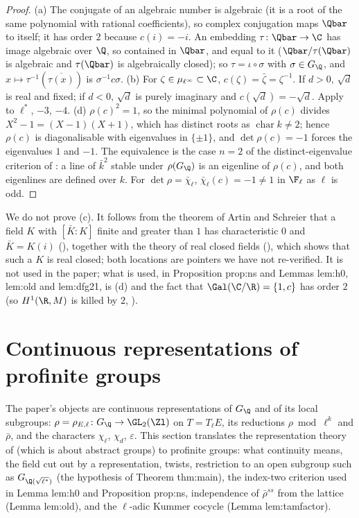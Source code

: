 \begin{proof}
(a) The conjugate of an algebraic number is algebraic (it is a root of the same polynomial with rational coefficients), so complex conjugation maps $\Qbar$ to
itself; it has order $2$ because $c(i)=-i$. An embedding $\tau\colon\Qbar\to\C$ has image algebraic over $\Q$, so contained in $\Qbar$, and equal to it
($\Qbar/\tau(\Qbar)$ is algebraic and $\tau(\Qbar)$ is algebraically closed); so $\tau=\iota\circ\sigma$ with $\sigma\in G_\Q$, and $x\mapsto\tau^{-1}(\overline{\tau(x)})$
is $\sigma^{-1}c\sigma$.
(b) For $\zeta\in\mu_{\ell^\infty}\subset\C$, $c(\zeta)=\bar\zeta=\zeta^{-1}$. If $d>0$, $\sqrt d$ is real and fixed; if $d<0$, $\sqrt d$ is purely imaginary and
$c(\sqrt d)=-\sqrt d$. Apply to $\ell^*$, $-3$, $-4$.
(d) $\rho(c)^2=1$, so the minimal polynomial of $\rho(c)$ divides $X^2-1=(X-1)(X+1)$, which has distinct roots as $\operatorname{char}k\ne2$; hence $\rho(c)$ is
diagonalisable with eigenvalues in $\{\pm1\}$, and $\det\rho(c)=-1$ forces the eigenvalues $1$ and $-1$. The equivalence is the case $n=2$ of the distinct-eigenvalue
criterion of : a line of $\bar k^2$ stable under $\rho(G_\Q)$ is an eigenline of $\rho(c)$, and both eigenlines are defined over $k$. For
$\det\rho=\bar\chi_\ell$, $\bar\chi_\ell(c)=-1\ne1$ in $\F_\ell$ as $\ell$ is odd.
\end{proof}

We do not prove (c). It follows from the theorem of Artin and Schreier that a field $K$ with $[\bar K:K]$ finite and greater than $1$ has characteristic $0$ and
$\bar K=K(i)$ (\cite[Chapter VI, Section 9]{Lang}), together with the theory of real closed fields (\cite[Chapter XI]{Lang}), which shows that such a $K$ is real closed;
both locations are pointers we have not re-verified. It is not used in the paper; what is used, in Proposition prop:ns and Lemmas lem:h0, lem:old and lem:dfg21, is
(d) and the fact that $\Gal(\C/\R)=\{1,c\}$ has order $2$ (so $H^1(\R,M)$ is killed by $2$, ).

\section[Continuous representations]{Continuous representations of profinite groups}\label{sec:galois:reps}

The paper's objects are continuous representations of $G_\Q$ and of its local subgroups: $\rho=\rho_{E,\ell}\colon G_\Q\to\GL_2(\Zl)$ on $T=T_\ell E$, its reductions
$\rho\bmod\ell^k$ and $\bar\rho$, and the characters $\chi_\ell$, $\chi_d$, $\varepsilon$. This section translates the representation theory of 
(which is about abstract groups) to profinite groups: what continuity means, the field cut out by a representation, twists, restriction to an open subgroup such as
$G_{\Q(\sqrt{\ell^*})}$ (the hypothesis of Theorem thm:main), the index-two criterion used in Lemma lem:h0 and Proposition prop:ns, independence of $\bar\rho^{ss}$ from the
lattice (Lemma lem:old), and the $\ell$-adic Kummer cocycle (Lemma lem:tamfactor).

